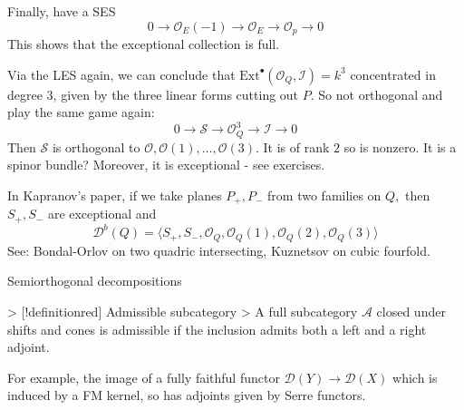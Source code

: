 Finally, have a SES $$0\rightarrow \mathcal{O}_{E}(-1)\xrightarrow{}\mathcal{O}_{E}\xrightarrow{}\mathcal{O}_{p}\xrightarrow{}0$$This shows that the exceptional collection is full. 


Via the LES again, we can conclude that $\mathrm{Ext}^\bullet(\mathcal{O}_{Q}, \mathcal{I})=k^3$ concentrated in degree 3, given by the three linear forms cutting out $P$. So not orthogonal and play the same game again: $$0\xrightarrow{}\mathcal{S}\xrightarrow{}\mathcal{O}_{Q}^3\xrightarrow{}\mathcal{I}\xrightarrow{}0$$Then $\mathcal{S}$ is orthogonal to $\mathcal{O}, \mathcal{O}(1),\dots,\mathcal{O}(3)$. It is of rank $2$ so is nonzero. It is a spinor bundle? Moreover, it is exceptional - see exercises.

In Kapranov's paper, if we take planes $P_+, P_-$ from two families on $Q,$ then $S_+, S_-$ are exceptional and $$\mathcal{D}^b(Q)=\langle S_{+},S_{-}, \mathcal{O}_{Q}, \mathcal{O}_{Q}(1), \mathcal{O}_{Q}(2), \mathcal{O}_{Q}(3)\rangle$$
See: Bondal-Orlov on two quadric intersecting, Kuznetsov on cubic fourfold.

 Semiorthogonal decompositions

> [!definitionred] Admissible subcategory
> A full subcategory $\mathcal{A}$ closed under shifts and cones is admissible if the inclusion admits both a left and a right adjoint.

For example, the image of a fully faithful functor $\mathcal{D}(Y)\xrightarrow{}\mathcal{D}(X)$ which is induced by a FM kernel, so has adjoints given by Serre functors.

